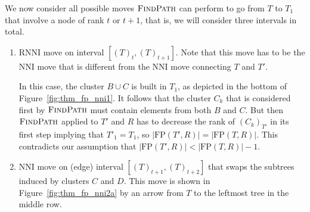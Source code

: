 \documentclass[11pt]{amsart}
\newcommand{\rnni}{\mathrm{RNNI}}
\newcommand{\findpath}{\textsc{FindPath}}
\newcommand{\nni}{\mathrm{NNI}}
\newcommand{\fp}{\mathrm{FP}}
\begin{document}
We now consider all possible moves $\findpath$ can perform to go from $T$ to $T_1$ that involve a node of rank $t$ or $t+1$, that is, we will consider three intervals in total.

\begin{enumerate}[label = 1.{\arabic*}]
\item $\rnni$ move on interval $[(T)_t, (T)_{t+1}]$.
Note that this move has to be the $\nni$ move that is different from the $\nni$ move connecting $T$ and $T'$.

In this case, the cluster $B \cup C$ is built in $T_1$, as depicted in the bottom of Figure~\ref{fig:thm_fp_nni1}.
It follows that the cluster $C_k$ that is considered first by $\findpath$ must contain elements from both $B$ and $C$.
But then $\findpath$ applied to $T'$ and $R$ has to decrease the rank of $(C_k)_{T'}$ in its first step implying that $T'_1 = T_1$, so $|\fp(T',R)| = |\fp(T,R)|$.
This contradicts our assumption that $|\fp(T',R)| < |\fp(T,R)| - 1$.

\item $\nni$ move on (edge) interval $[(T)_{t+1}, (T)_{t+2}]$ that swaps the subtrees induced by clusters $C$ and $D$.
This move is shown in Figure~\ref{fig:thm_fp_nni2a} by an arrow from $T$ to the leftmost tree in the middle row.


\end{enumerate}
\end{document}
